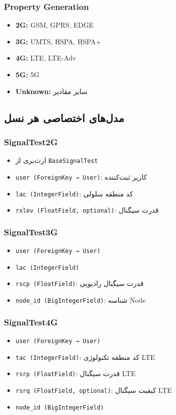 \documentclass{report}
\begin{document}
\subsubsection{Property Generation}
\begin{itemize}
    \item \textbf{2G:} GSM, GPRS, EDGE
    \item \textbf{3G:} UMTS, HSPA, HSPA+
    \item \textbf{4G:} LTE, LTE-Adv
    \item \textbf{5G:} 5G
    \item \textbf{Unknown:} سایر مقادیر
\end{itemize}

\subsection{مدل‌های اختصاصی هر نسل}

\subsubsection{SignalTest2G}
\begin{itemize}
    \item ارث‌بری از \texttt{BaseSignalTest}
    \item \texttt{user (ForeignKey → User)}: کاربر ثبت‌کننده
    \item \texttt{lac (IntegerField)}: کد منطقه سلولی
    \item \texttt{rxlev (FloatField, optional)}: قدرت سیگنال
\end{itemize}

\subsubsection{SignalTest3G}
\begin{itemize}
    \item \texttt{user (ForeignKey → User)}
    \item \texttt{lac (IntegerField)}
    \item \texttt{rscp (FloatField)}: قدرت سیگنال رادیویی
    \item \texttt{node\_id (BigIntegerField)}: شناسه Node
\end{itemize}

\subsubsection{SignalTest4G}
\begin{itemize}
    \item \texttt{user (ForeignKey → User)}
    \item \texttt{tac (IntegerField)}: کد منطقه تکنولوژی LTE
    \item \texttt{rsrp (FloatField)}: قدرت سیگنال LTE
    \item \texttt{rsrq (FloatField, optional)}: کیفیت سیگنال LTE
    \item \texttt{node\_id (BigIntegerField)}
\end{itemize}
\end{document}

